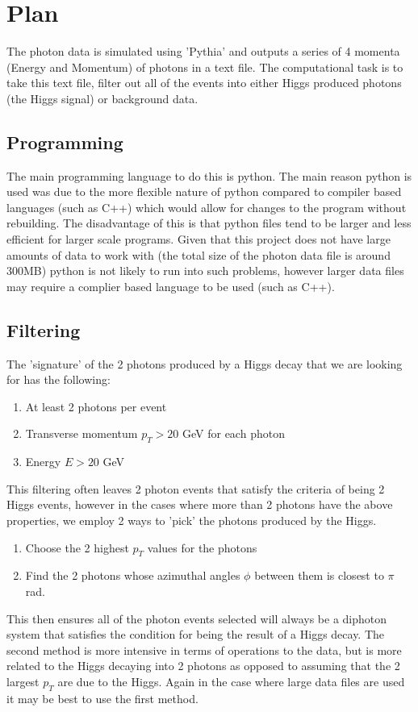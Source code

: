 \documentclass{article}
\begin{document}
\section{Plan}
The photon data is simulated using 'Pythia' and outputs a series of 4 momenta (Energy and Momentum) of photons in a text file. The computational task is to take this text file, filter out all of the events into either Higgs produced photons (the Higgs signal) or background data.
\subsection{Programming}
The main programming language to do this is python. The main reason python is used was due to the more flexible nature of python compared to compiler based languages (such as C++) which would allow for changes to the program without rebuilding.
The disadvantage of this is that python files tend to be larger and less efficient for larger scale programs. Given that this project does not have large amounts of data to work with (the total size of the photon data file is around 300MB) python is not likely to run into such problems, however larger data files may require a complier based language to be used (such as C++).
\subsection{Filtering}
The 'signature' of the 2 photons produced by a Higgs decay that we are looking for has the following:
\begin{enumerate}
\item At least 2 photons per event
\item Transverse momentum $p_T > 20$ GeV for each photon
\item Energy $E > 20$ GeV
\end{enumerate}
This filtering often leaves 2 photon events that satisfy the criteria of being 2 Higgs events, however in the cases where more than 2 photons have the above properties, we employ 2 ways to 'pick' the photons produced by the Higgs.
\begin{enumerate}
\item Choose the 2 highest $p_T$ values for the photons
\item Find the 2 photons whose azimuthal angles $\phi$ between them is closest to $\pi$ rad.
\end{enumerate}
This then ensures all of the photon events selected will always be a diphoton system that satisfies the condition for being the result of a Higgs decay. 
The second method is more intensive in terms of operations to the data, but is more related to the Higgs decaying into 2 photons as opposed to assuming that the 2 largest $p_T$ are due to the Higgs. Again in the case where large data files are used it may be best to use the first method.
\end{document}
